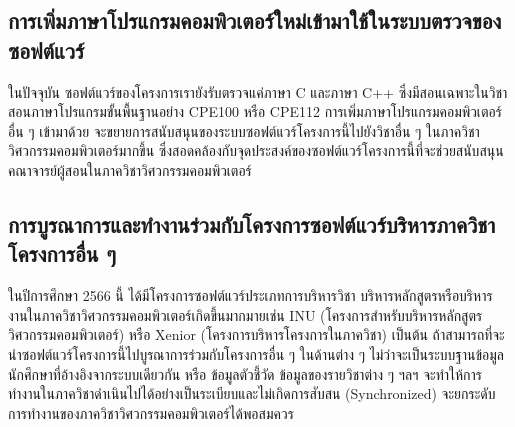 \documentclass[12pt,one side,openright,a4paper]{cpe-thesis-th}
\newcommand{\thaijustify}[1]{%
  \par\hspace{30pt}\justifying
  #1
}
\begin{document}
    \subsection{การเพิ่มภาษาโปรแกรมคอมพิวเตอร์ใหม่เข้ามาใช้ในระบบตรวจของซอฟต์แวร์}
        \thaijustify{
            ในปัจจุบัน ซอฟต์แวร์ของโครงการเรายังรับตรวจแค่ภาษา C และภาษา C++ ซึ่งมีสอนเฉพาะในวิชาสอนภาษาโปรแกรมขั้นพื้นฐานอย่าง CPE100 หรือ CPE112 การเพิ่มภาษาโปรแกรมคอมพิวเตอร์อื่น ๆ เข้ามาด้วย จะขยายการสนับสนุนของระบบซอฟต์แวร์โครงการนี้ไปยังวิชาอื่น ๆ ในภาควิชาวิศวกรรมคอมพิวเตอร์มากขึ้น ซึ่งสอดคล้องกับจุดประสงค์ของซอฟต์แวร์โครงการนี้ที่จะช่วยสนับสนุนคณาจารย์ผู้สอนในภาควิชาวิศวกรรมคอมพิวเตอร์
        }
    \subsection{การบูรณาการและทำงานร่วมกับโครงการซอฟต์แวร์บริหารภาควิชาโครงการอื่น ๆ}
        \thaijustify{
            ในปีการศึกษา 2566 นี้ ได้มีโครงการซอฟต์แวร์ประเภทการบริหารวิชา บริหารหลักสูตรหรือบริหารงานในภาควิชาวิศวกรรมคอมพิวเตอร์เกิดขึ้นมากมายเช่น INU (โครงการสำหรับบริหารหลักสูตรวิศวกรรมคอมพิวเตอร์) หรือ Xenior (โครงการบริหารโครงการในภาควิชา) เป็นต้น ถ้าสามารถที่จะนำซอฟต์แวร์โครงการนี้ไปบูรณาการร่วมกับโครงการอื่น ๆ ในด้านต่าง ๆ ไม่ว่าจะเป็นระบบฐานข้อมูลนักศึกษาที่อ้างอิงจากระบบเดียวกัน หรือ ข้อมูลตัวชี้วัด ข้อมูลของรายวิชาต่าง ๆ ฯลฯ จะทำให้การทำงานในภาควิชาดำเนินไปได้อย่างเป็นระเบียบและไม่เกิดการสับสน (Synchronized) จะยกระดับการทำงานของภาควิชาวิศวกรรมคอมพิวเตอร์ได้พอสมควร
        }


\makeatletter
\g@addto@macro{\UrlBreaks}{\UrlOrds}
\makeatother

\printbibliography


% 
\end{document}

